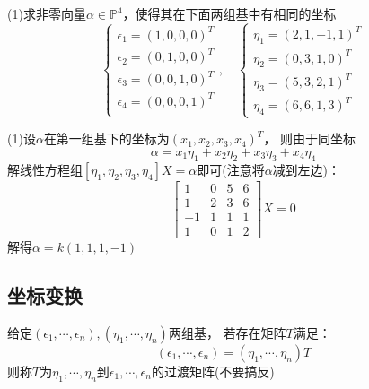 \begin{exercise}[难度进阶]
  (1)求非零向量$\alpha \in \mathbb{P}^4$，使得其在下面两组基中有相同的坐标
  \begin{equation*}
    \begin{cases}
      \epsilon_1 = (1,0,0,0)^T\\
      \epsilon_2 = (0,1,0,0)^T\\
      \epsilon_3 = (0,0,1,0)^T\\
      \epsilon_4 = (0,0,0,1)^T\\
    \end{cases}, \quad
    \begin{cases}
      \eta_1 = (2,1,-1,1)^T\\
      \eta_2 = (0,3,1,0)^T\\
      \eta_3 = (5,3,2,1)^T\\
      \eta_4 = (6,6,1,3)^T
    \end{cases}
  \end{equation*}
\end{exercise}

\begin{solution}
  (1)设$\alpha$在第一组基下的坐标为$(x_1,x_2,x_3,x_4)^T$，
  则由于同坐标
  \begin{equation*}
    \alpha = x_1\eta_1 + x_2\eta_2 + x_3\eta_3 + x_4\eta_4
  \end{equation*}
  解线性方程组$[\eta_1,\eta_2,\eta_3,\eta_4]X = \alpha$即可(注意将$\alpha$减到左边)：
  \begin{equation*}
    \left[
      \begin{array}{cccc}
        1&0&5&6 \\
         1&2&3&6 \\
         -1&1&1&1 \\
         1&0&1&2
      \end{array}
    \right]X = 0
  \end{equation*}
  解得$\alpha = k(1,1,1,-1)$
\end{solution}

\subsection{坐标变换}

\begin{definition}[过渡矩阵]
  给定$(\epsilon_1,\cdots,\epsilon_n),(\eta_1,\cdots,\eta_n)$两组基，
  若存在矩阵$T$满足：
  \begin{equation*}
    (\epsilon_1,\cdots,\epsilon_n) = (\eta_1,\cdots,\eta_n) T
  \end{equation*}
  则称$T$为$\eta_1,\cdots,\eta_n$到$\epsilon_1,\cdots,\epsilon_n$的过渡矩阵(不要搞反)
\end{definition}

